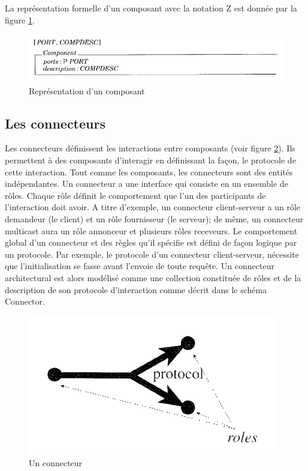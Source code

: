 La représentation formelle d'un composant avec la notation Z est donnée par la figure \ref{fig:Z_component_schema}.
\begin{figure}[h!]
  \includegraphics[scale=0.7]{images/Z_component_schema.png}
  \caption{Représentation d'un composant}
  \label{fig:Z_component_schema}
\end{figure}

\subsection{Les connecteurs}
Les connecteurs définissent les interactions entre composants (voir figure \ref{fig:Z_connector}). Ils permettent à des composants d'interagir en définissant la façon, le protocole de cette interaction. Tout comme les composants, les connecteurs sont des entités indépendantes. Un connecteur a une interface qui consiste en un ensemble de rôles. Chaque rôle définit le comportement que l'un des participants de l'interaction doit avoir. A titre d'exemple, un connecteur client-serveur a un rôle demandeur (le client) et un rôle fournisseur (le serveur); de même, un connecteur multicast aura un rôle annonceur et plusieurs rôles receveurs. Le comportement global d'un connecteur et des règles qu'il spécifie est défini de façon logique par un protocole. Par exemple, le protocole d'un connecteur client-serveur, nécessite que l'initialisation se fasse avant l'envoie de toute requête. Un connecteur architectural est alors modélisé comme une collection constituée de rôles et de la description de son protocole d'interaction comme décrit dans le schéma Connector.
\begin{figure}[h!]
\includegraphics[scale=0.7]{images/connecteur_Z.png}
  \caption{Un connecteur}
  \label{fig:Z_connector}
\end{figure}
